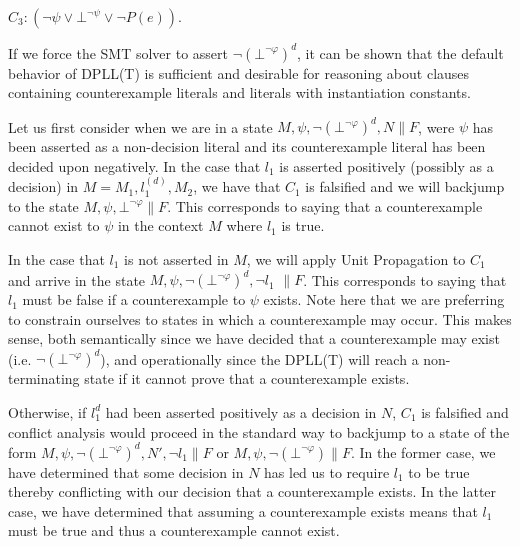 \documentclass{llncs}
\begin{document}
$C_3 : ( \neg \psi \vee \bot^{\neg \psi} \vee \neg P( e ) )$.

If we force the SMT solver to assert $\neg( \bot^{\neg \varphi} )^d$, it can be shown that the default behavior of DPLL(T) is sufficient and desirable for reasoning about clauses containing counterexample literals and literals with instantiation constants.

Let us first consider when we are in a state $M, \psi, \neg( \bot^{\neg \varphi} )^d, N \parallel F$, were $\psi$ has been asserted as a non-decision literal and its counterexample literal has been decided upon negatively.
In the case that $l_1$ is asserted positively (possibly as a decision) in $M = M_1, l^{(d)}_1, M_2$, we have that $C_1$ is falsified and we will backjump to the state $M, \psi, \bot^{\neg \varphi} \parallel F$.
This corresponds to saying that a counterexample cannot exist to $\psi$ in the context $M$ where $l_1$ is true.

In the case that $l_1$ is not asserted in $M$, we will apply Unit Propagation to $C_1$ and arrive in the state $M, \psi, \neg( \bot^{\neg \varphi} )^d, \neg l_1$ $\parallel F$.
This corresponds to saying that $l_1$ must be false if a counterexample to $\psi$ exists.
Note here that we are preferring to constrain ourselves to states in which a counterexample may occur.
This makes sense, both semantically since we have decided that a counterexample may exist (i.e. $\neg( \bot^{\neg \varphi} )^d$), and operationally since the DPLL(T) will reach a non-terminating state if it cannot prove that a counterexample exists.

Otherwise, if $l_1^d$ had been asserted positively as a decision in $N$, $C_1$ is falsified and conflict analysis would proceed in the standard way to backjump to a state of the form $M, \psi, \neg( \bot^{\neg \varphi} )^d, N', \neg l_1 \parallel F$ or $M, \psi, \neg( \bot^{\neg \varphi} )  \parallel F$.
In the former case, we have determined that some decision in $N$ has led us to require $l_1$ to be true thereby conflicting with our decision that a counterexample exists.
In the latter case, we have determined that assuming a counterexample exists means that $l_1$ must be true and thus a counterexample cannot exist.


\end{document}
